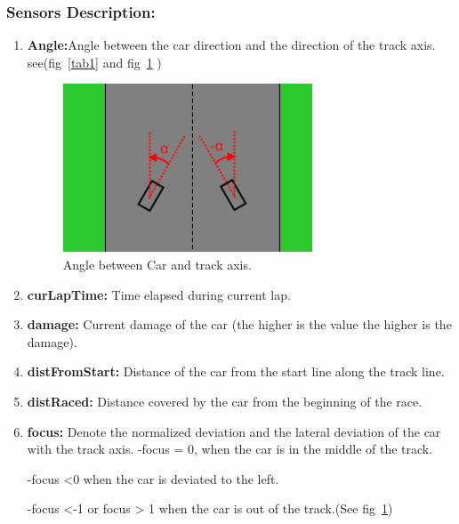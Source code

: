 \documentclass{llncs}
\begin{document}
\subsubsection{Sensors Description:}
\begin{enumerate}
	\item \textbf{Angle:}Angle between the car direction and the direction of the
	track axis. see(fig~\ref{tab1} and fig~\ref{tab11} )
	\begin{figure}[h!]
		
		\centering
		\includegraphics[width=0.7\textwidth]{fig/angle1.png}
		\begin{minipage}{10cm}
			\centering
			\caption{\footnotesize Angle between Car and track axis.}
			\label{tab11}
		\end{minipage} 

		
	\end{figure}
	
	\item \textbf{curLapTime:}  Time elapsed during current lap.
	\item\textbf{damage:}  Current damage of the car (the higher is the value the higher
	is the damage).
	\item \textbf{distFromStart:}  Distance of the car from the start line along the track line.
	\item \textbf{distRaced:}  Distance covered by the car from the beginning of the race.
	\item \textbf{focus:}  Denote the normalized deviation and the lateral deviation of the car with the track axis.
	-focus = 0, when the car is in the middle of the track. 
	
	-focus <0 when the car is deviated to the left.
	
	-focus <-1 or focus > 1 when the car is out of the track.(See fig~\ref{tab11})
	\begin{figure}[h!]
		

\end{figure}
\end{enumerate}
\end{document}
